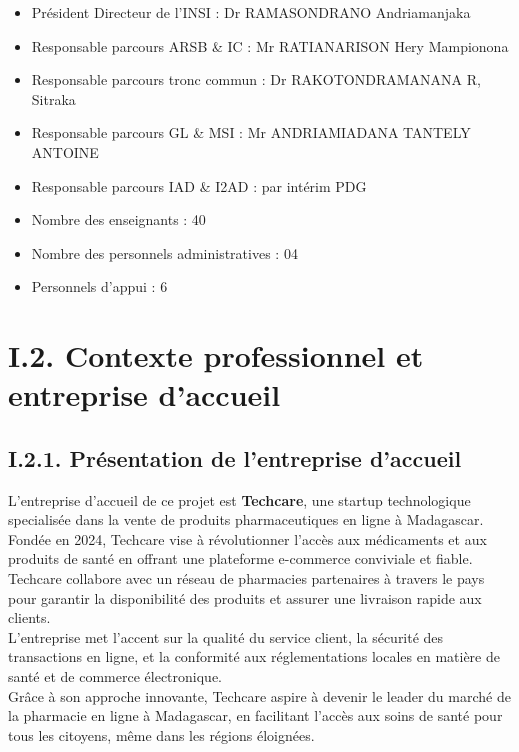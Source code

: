 \begin{itemize}
    \item Président Directeur de l'INSI : Dr RAMASONDRANO Andriamanjaka
    \item Responsable parcours ARSB \& IC : Mr RATIANARISON Hery Mampionona
    \item Responsable parcours tronc commun : Dr RAKOTONDRAMANANA R, Sitraka
    \item Responsable parcours GL \& MSI : Mr ANDRIAMIADANA TANTELY ANTOINE
    \item Responsable parcours IAD \& I2AD : par intérim PDG
    \item Nombre des enseignants : 40
    \item Nombre des personnels administratives : 04
    \item Personnels d'appui : 6
\end{itemize}

\section{I.2. Contexte professionnel et entreprise d'accueil}
\subsection{I.2.1. Présentation de l'entreprise d'accueil}
L'entreprise d'accueil de ce projet est \textbf{Techcare}, une startup technologique specialisée dans la vente 
de produits pharmaceutiques en ligne à Madagascar.\\ Fondée en 2024, Techcare vise à révolutionner l'accès aux médicaments et aux produits de santé en offrant une plateforme e-commerce conviviale et fiable.\\
Techcare collabore avec un réseau de pharmacies partenaires à travers le pays pour garantir la disponibilité
des produits et assurer une livraison rapide aux clients.\\
L'entreprise met l'accent sur la qualité du service client, la sécurité des transactions en ligne, et la conformité aux réglementations locales en matière de santé et de commerce électronique.\\
Grâce à son approche innovante, Techcare aspire à devenir le leader du marché de la pharmacie en ligne à Madagascar, en facilitant l'accès aux soins de santé pour tous les citoyens, même dans les régions éloignées.


